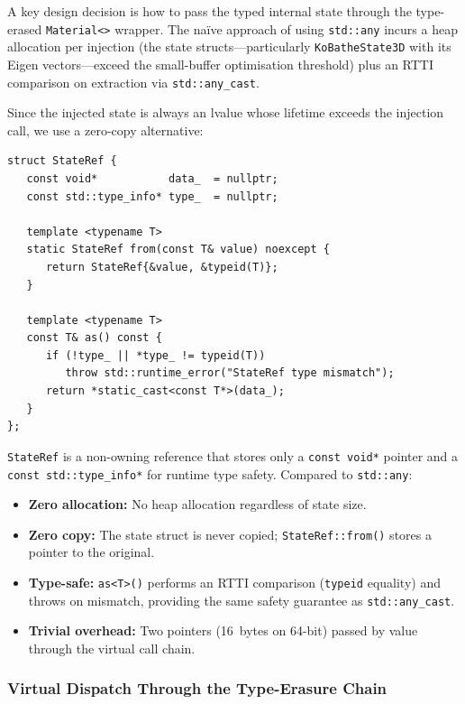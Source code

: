A key design decision is how to pass the typed internal state through
the type-erased \texttt{Material<>} wrapper.  The na\"ive approach of
using \texttt{std::any} incurs a heap allocation per injection
(the state structs---particularly \texttt{KoBatheState3D} with its
Eigen vectors---exceed the small-buffer optimisation threshold) plus
an RTTI comparison on extraction via \texttt{std::any\_cast}.

Since the injected state is always an lvalue whose lifetime exceeds
the injection call, we use a zero-copy alternative:

\begin{lstlisting}
struct StateRef {
   const void*           data_  = nullptr;
   const std::type_info* type_  = nullptr;

   template <typename T>
   static StateRef from(const T& value) noexcept {
      return StateRef{&value, &typeid(T)};
   }

   template <typename T>
   const T& as() const {
      if (!type_ || *type_ != typeid(T))
         throw std::runtime_error("StateRef type mismatch");
      return *static_cast<const T*>(data_);
   }
};
\end{lstlisting}

\texttt{StateRef} is a non-owning reference that stores only a
\texttt{const void*} pointer and a \texttt{const std::type\_info*}
for runtime type safety.  Compared to \texttt{std::any}:

\begin{itemize}
  \item \textbf{Zero allocation:}  No heap allocation regardless of
    state size.
  \item \textbf{Zero copy:}  The state struct is never copied;
    \texttt{StateRef::from()} stores a pointer to the original.
  \item \textbf{Type-safe:}  \texttt{as<T>()} performs an RTTI
    comparison (\texttt{typeid} equality) and throws on mismatch,
    providing the same safety guarantee as \texttt{std::any\_cast}.
  \item \textbf{Trivial overhead:}  Two pointers (16~bytes on 64-bit)
    passed by value through the virtual call chain.
\end{itemize}


\subsubsection{Virtual Dispatch Through the Type-Erasure Chain}

